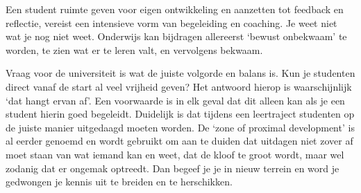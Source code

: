 \documentclass{jote-book}
\begin{document}
	Een student ruimte geven voor eigen ontwikkeling en aanzetten tot feedback en reflectie, vereist een intensieve vorm van begeleiding en coaching. Je weet niet wat je nog niet weet. Onderwijs kan bijdragen allereerst ‘bewust onbekwaam' te worden, te zien wat er te leren valt, en vervolgens bekwaam.



	Vraag voor de universiteit is wat de juiste volgorde en balans is. Kun je studenten direct vanaf de start al veel vrijheid geven? Het antwoord hierop is waarschijnlijk ‘dat hangt ervan af'. Een voorwaarde is in elk geval dat dit alleen kan als je een student hierin goed begeleidt. Duidelijk is dat tijdens een leertraject studenten op de juiste manier uitgedaagd moeten worden. De ‘zone of proximal development' is al eerder genoemd en wordt gebruikt om aan te duiden dat uitdagen niet zover af moet staan van wat iemand kan en weet, dat de kloof te groot wordt, maar wel zodanig dat er ongemak optreedt. Dan begeef je je in nieuw terrein en word je gedwongen je kennis uit te breiden en te herschikken.
\end{document}
